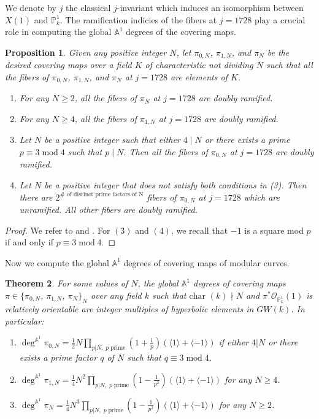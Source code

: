 \documentclass[12pt, reqno]{amsart}
\newtheorem{theorem}{Theorem}[section]
\newtheorem{proposition}[theorem]{Proposition}
\theoremstyle{definition}
\newcommand{\A}{\mathbb{A}} %
\newcommand{\Proj}{\mathbb{P}} %
\newcommand{\Adeg}{\deg^{\mathbb{A}^1}} %
\newcommand{\Oh}{\mathscr{O}} %
\begin{document}
We denote by $j$ the classical $j$-invariant which induces an isomorphism between $X(1)$ and $\Proj^1_k$. The ramification indicies of the fibers at $j = 1728$ play a crucial role in computing the global $\A^1$ degrees of the covering maps.

\begin{proposition}\label{ram}
Given any positive integer $N$, let $\pi_{0,N}$, $\pi_{1,N}$, and $\pi_N$ be the desired covering maps over a field $K$ of characteristic not dividing $N$ such that all the fibers of $\pi_{0,N}$, $\pi_{1,N}$, and $\pi_{N}$ at $j = 1728$ are elements of $K$.
\begin{enumerate}
    \item For any $N \geq 2$, all the fibers of $\pi_N$ at $j = 1728$ are doubly ramified.
    \item For any $N \geq 4$, all the fibers of $\pi_{1,N}$ at $j = 1728$ are doubly ramified.
    \item Let $N$ be a positive integer such that either $4 \mid N$ or there exists a prime $p \equiv 3 \; \text{mod} \; 4$ such that $p \mid N$. Then all the fibers of $\pi_{0,N}$ at $j = 1728$ are doubly ramified.
    \item Let $N$ be a positive integer that does not satisfy both conditions in (3). Then there are $2^{\# \text{ of distinct prime factors of N}}$ fibers of $\pi_{0,N}$ at $j = 1728$ which are unramified. All other fibers are doubly ramified.
\end{enumerate}
\end{proposition}
\begin{proof}
We refer to \cite[Section 1]{shimura} and \cite[Section 9]{diamondim}. For $(3)$ and $(4)$, we recall that $-1$ is a square mod $p$ if and only if $p \equiv 3 \; \textrm{mod} \; 4$.
\end{proof}

Now we compute the global $\A^1$ degrees of covering maps of modular curves.

\begin{theorem}\label{mainA}
For some values of $N$, the global $\A^1$ degrees of covering maps $\pi \in \{\pi_{0,N}$, $\pi_{1,N}$, $\pi_{N}\}_{N}$ over any field $k$ such that $\text{char }(k) \nmid N$ and $\pi^* \Oh_{\Proj^1_k}(1)$ is relatively orientable are integer multiples of hyperbolic elements in $GW(k)$. In particular:
\begin{enumerate}
    \item $\Adeg \pi_{0,N} = \frac{1}{2} N \prod_{p | N, \; p \; \text{prime}} \left(1 + \frac{1}{p} \right) \left(\langle 1 \rangle + \langle -1 \rangle \right) $ if either $4 | N$ or  there exists a prime factor $q$ of $N$ such that $q \equiv 3 \; \text{mod} \; 4$.
    \item $\Adeg \pi_{1,N} = \frac{1}{4} N^2 \prod_{p | N, \; p \; \text{prime}} \left(1 - \frac{1}{p^2} \right) \left(\langle 1 \rangle + \langle -1 \rangle \right) $ for any $N \geq 4$.
    \item $\Adeg \pi_N = \frac{1}{4} N^3 \prod_{p | N, \; p \; \text{prime}} \left(1 - \frac{1}{p^2} \right) \left( \langle 1 \rangle + \langle -1 \rangle \right)$ for any $N \geq 2$.
\end{enumerate}
\end{theorem}
\end{document}
